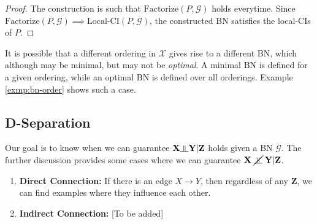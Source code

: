 \begin{proof}
The construction is such that $\text{Factorize}(P, \mathcal G)$ holds everytime. Since $\text{Factorize}(P, \mathcal G) \implies \text{Local-CI}(P, \mathcal G)$, the constructed BN satisfies the local-CIs of $P$.
\end{proof}
\begin{rem}
It is possible that a different ordering in $\mathcal X$ gives rise to a different BN, which although may be minimal, but may not be \textit{optimal}. A minimal BN is defined for a given ordering, while an optimal BN is defined over all orderings. Example \ref{exmp:bn-order} shows such a case.
\end{rem}
\subsection{D-Separation}
Our goal is to know when we can guarantee $\mathbf X \ind \mathbf Y|\mathbf Z$ holds given a BN  $\mathcal G$. The further discussion provides some cases where we can guarantee $\mathbf X\; \cancel\ind\; \mathbf Y|\mathbf Z$.
\begin{enumerate}
	\item \textbf{Direct Connection:} If there is an edge $X \to Y$, then regardless of any $\mathbf Z$, we can find examples where they influence each other.
	\item \textbf{Indirect Connection:} [To be added]
\end{enumerate}